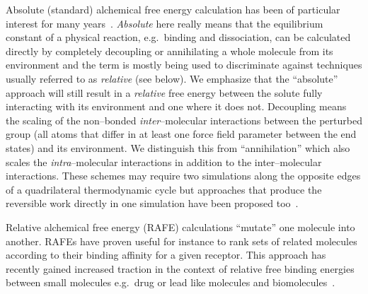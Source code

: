 \documentclass[journal=jctcce,manuscript=article]{achemso}
\begin{document}
Absolute (standard) alchemical free energy calculation has been of 
particular interest for many years~\cite{GILSON19971047,
  doi:10.1021/jp0217839, deng_computations_2009, ytreberg_comparison_2006, doi:10.1021/ct500964e, jorgensen1988efficient}.  \emph{Absolute}
here really means that the equilibrium constant of a physical
reaction, e.g.\ binding and dissociation, can be calculated directly
by completely decoupling or annihilating a whole molecule from its environment 
and the term is mostly being used to discriminate against techniques usually 
referred to as \emph{relative} (see below).  We emphasize that the 
``absolute'' approach will still result in a \emph{relative} free energy 
between the solute fully interacting with its environment and one where it does 
not.  Decoupling means the scaling of the non--bonded 
\emph{inter}--molecular interactions between the perturbed group (all atoms 
that differ in at least one force field parameter between the end states) and 
its environment.  We distinguish this from ``annihilation'' which also
scales the \emph{intra}--molecular interactions in addition to the 
inter--molecular interactions. These schemes may require two 
simulations along the opposite edges of a quadrilateral thermodynamic cycle 
but approaches that produce the reversible work directly in one simulation
have been proposed too~\cite{doi:10.1063/1.3519057, C3FD00125C}.

Relative alchemical free energy (RAFE) calculations ``mutate'' one
molecule into another.  RAFEs have proven useful for instance to rank sets of related  molecules according to their binding affinity for a given receptor.  This approach has 
recently gained increased traction in the context of relative free binding 
energies between small molecules e.g.\ drug or lead like molecules and 
biomolecules~\cite{doi:10.1021/ja512751q, 
doi:10.1021/acs.jctc.6b00991}.
\end{document}
